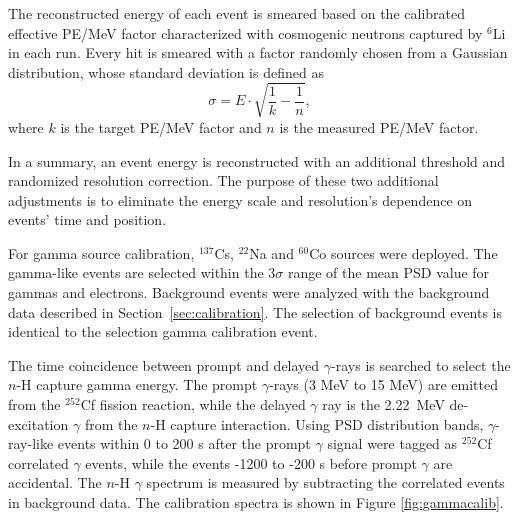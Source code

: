 The reconstructed energy of each event is smeared based on the calibrated effective PE/MeV factor characterized with cosmogenic neutrons captured by $^6$Li in each run. 
Every hit is smeared with a factor randomly chosen from a Gaussian distribution, whose standard deviation is defined as
\begin{equation}
	\sigma = E\cdot\sqrt{\frac{1}{k} - \frac{1}{n}},
\end{equation}
where $k$ is the target PE/MeV factor and $n$ is the measured PE/MeV factor.

In a summary, an event energy is reconstructed with an additional threshold and randomized resolution correction.
The purpose of these two additional adjustments is to eliminate the energy scale and resolution's dependence on events' time and position.


For gamma source calibration, $^{137}$Cs, $^{22}$Na and $^{60}$Co sources were deployed.
The gamma-like events are selected within the 3$\sigma$ range of the mean PSD value for gammas and electrons.
Background events were analyzed with the background data described in Section~\ref{sec:calibration}.
The selection of background events is identical to the selection gamma calibration event.

The time coincidence between prompt and delayed $\gamma$-rays is searched to select the $n$-H capture gamma energy.
The prompt $\gamma$-rays (3 MeV to 15 MeV) are emitted from the $^{252}$Cf fission reaction, while the delayed $\gamma$ ray is the 2.22~MeV de-excitation $\gamma$ from the $n$-H capture interaction.
Using PSD distribution bands, $\gamma$-ray-like events within 0 to 200 \textmu s after the prompt $\gamma$ signal were tagged as $^{252}$Cf correlated $\gamma$ events, while the events -1200 to -200 \textmu s before prompt $\gamma$ are accidental.
The $n$-H $\gamma$ spectrum is measured by subtracting the correlated events in background data.
The calibration spectra is shown in Figure \ref{fig:gammacalib}.

